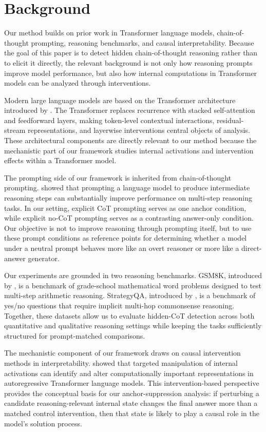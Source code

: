 \documentclass{article}
\theoremstyle{plain}
\theoremstyle{definition}
\theoremstyle{remark}
\begin{document}
\section{Background}

Our method builds on prior work in Transformer language models, chain-of-thought prompting, reasoning benchmarks, and causal interpretability. Because the goal of this paper is to detect hidden chain-of-thought reasoning rather than to elicit it directly, the relevant background is not only how reasoning prompts improve model performance, but also how internal computations in Transformer models can be analyzed through interventions.

Modern large language models are based on the Transformer architecture introduced by \citet{vaswani_attention_2023}. The Transformer replaces recurrence with stacked self-attention and feedforward layers, making token-level contextual interactions, residual-stream representations, and layerwise interventions central objects of analysis. These architectural components are directly relevant to our method because the mechanistic part of our framework studies internal activations and intervention effects within a Transformer model.

The prompting side of our framework is inherited from chain-of-thought prompting. \citet{wei_chain--thought_2023} showed that prompting a language model to produce intermediate reasoning steps can substantially improve performance on multi-step reasoning tasks. In our setting, explicit CoT prompting serves as one anchor condition, while explicit no-CoT prompting serves as a contrasting answer-only condition. Our objective is not to improve reasoning through prompting itself, but to use these prompt conditions as reference points for determining whether a model under a neutral prompt behaves more like an overt reasoner or more like a direct-answer generator.

Our experiments are grounded in two reasoning benchmarks. GSM8K, introduced by \citet{cobbe_training_2021}, is a benchmark of grade-school mathematical word problems designed to test multi-step arithmetic reasoning. StrategyQA, introduced by \citet{geva_did_2021}, is a benchmark of yes/no questions that require implicit multi-hop commonsense reasoning. Together, these datasets allow us to evaluate hidden-CoT detection across both quantitative and qualitative reasoning settings while keeping the tasks sufficiently structured for prompt-matched comparisons.

The mechanistic component of our framework draws on causal intervention methods in interpretability. \citet{meng_locating_2023} showed that targeted manipulation of internal activations can identify and alter computationally important representations in autoregressive Transformer language models. This intervention-based perspective provides the conceptual basis for our anchor-suppression analysis: if perturbing a candidate reasoning-relevant internal state changes the final answer more than a matched control intervention, then that state is likely to play a causal role in the model's solution process.
\end{document}

